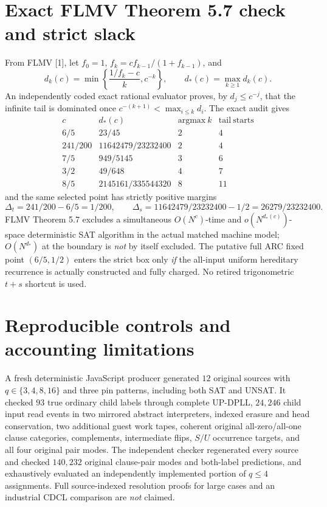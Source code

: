 \documentclass[11pt]{article}
\begin{document}
\section{Exact FLMV Theorem 5.7 check and strict slack}
From FLMV [1], let $f_0=1$, $f_k=cf_{k-1}/(1+f_{k-1})$, and
\[
d_k(c)=\min\left\{\frac{1/f_k-c}{k},c^{-k}\right\},\qquad
d_*(c)=\max_{k\ge1}d_k(c).
\]
An independently coded exact rational evaluator proves, by $d_j\le c^{-j}$, that the infinite tail is dominated once $c^{-(k+1)}<\max_{i\le k}d_i$. The exact audit gives
\[
\begin{array}{c|c|c|c}
c&d_*(c)&\mathrm{argmax}\ k&\mathrm{tail\ starts}\\\hline
6/5&23/45&2&4\\
241/200&11642479/23232400&2&4\\
7/5&949/5145&3&6\\
3/2&49/648&4&7\\
8/5&2145161/335544320&8&11
\end{array}
\]
and the same selected point has strictly positive margins
\[
\Delta_t=241/200-6/5=1/200,\qquad
\Delta_s=11642479/23232400-1/2=26279/23232400.
\]
FLMV Theorem 5.7 excludes a simultaneous $O(N^c)$-time and $o(N^{d_*(c)})$-space deterministic SAT algorithm in the actual matched machine model; $O(N^{d_*})$ at the boundary is \emph{not} by itself excluded. The putative full ARC fixed point $(6/5,1/2)$ enters the strict box only \emph{if} the all-input uniform hereditary recurrence is actually constructed and fully charged. No retired trigonometric $t+s$ shortcut is used.

\section{Reproducible controls and accounting limitations}
A fresh deterministic JavaScript producer generated $12$ original sources with $q\in\{3,4,8,16\}$ and three pin patterns, including both SAT and UNSAT. It checked $93$ true ordinary child labels through complete UP-DPLL, $24{,}246$ child input read events in two mirrored abstract interpreters, indexed erasure and head conservation, two additional guest work tapes, coherent original all-zero/all-one clause categories, complements, intermediate flips, $S/U$ occurrence targets, and all four original pair modes. The independent checker regenerated every source and checked $140{,}232$ original clause-pair modes and both-label predictions, and exhaustively evaluated an independently implemented portion of $q\le4$ assignments. Full source-indexed resolution proofs for large cases and an industrial CDCL comparison are \emph{not} claimed.
\end{document}
